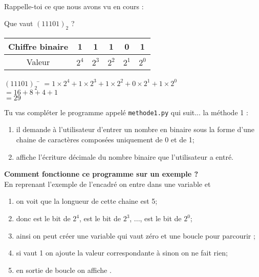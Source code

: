 \documentclass[a4paper,12pt,french]{book}
\begin{document}

\exo{}\\
Rappelle-toi ce que nous avons vu en cours :
\begin{methode}
Que vaut $(11101)_2$ ?
\begin{center}
	\begin{tabular}{|c|c|c|c|c|c|}
		\hline 
		Chiffre binaire & 1 & 1 & 1 & 0 & 1 \\ 
		\hline 
		Valeur & $2^4$ & $2^3$ & $2^2$ & $2^1$ & $2^0$ \\ 
		\hline 
	\end{tabular}
\end{center}
\begin{tabbing}
		$(11101)_2$	\= 	$=1\times 2^4+1\times 2^3+1\times 2^2+0\times 2^1+1\times 2^0$	\\
			\>	$=16+8+4+1$	\\	
			\>	$=29$	
	\end{tabbing}
\end{methode}

    Tu vas compléter le programme appelé \texttt{methode1.py} qui suit... la méthode 1 :
\begin{enumerate}[--]
	\item 	il demande à l'utilisateur d'entrer un nombre en binaire sous la forme d'une chaine de caractères composées uniquement de 0 et de 1;
	\item 	affiche l'écriture décimale du nombre binaire que l'utilisateur a entré.\\
\end{enumerate}

\textbf{Comment fonctionne ce programme sur un exemple ?}\\

En reprenant l'exemple de l'encadré on entre  dans une variable  et
\begin{enumerate}[--]
	\item 	on voit que la longueur de cette chaine est 5;
	\item 	donc  est le bit de $2^4$,  est le bit de $2^3$, ...,  est le bit de $2^0$;
	\item 	ainsi on peut créer une variable  qui vaut zéro et une boucle  pour parcourir ;
	\item 	si  vaut 1 on ajoute la valeur correspondante à  sinon on ne fait rien;
	\item 	en sortie de boucle on affiche .
\end{enumerate}
\end{document}
